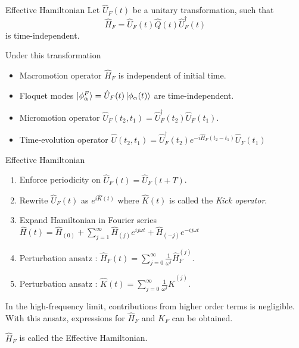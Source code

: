 \documentclass{beamer}
\begin{document}
\begin{frame}{Effective Hamiltonian}
 Let $\hat{U}_{F}(t)$ be a unitary transformation, such that
 \begin{equation}
  \hat{H}_{F} = \hat{U}_{F}(t)\hat{Q}(t)\hat{U}_{F}^{\dagger}(t)
 \end{equation} is time-independent.
 
 Under this transformation
 \begin{itemize}
  \item Macromotion operator $\hat{H}_{F}$ is independent of initial time.
  \item Floquet modes $\ket{\phi_\alpha^{F}} = \hat{U}_{F}(t)\ket{\phi_\alpha (t)}$ are time-independent.
  \item Micromotion operator $\hat{U}_{F}(t_2, t_1) = \hat{U}_{F}^{\dagger}(t_2)\hat{U}_{F}(t_1)$.
  \item Time-evolution operator $\hat{U}(t_2, t_1) = \hat{U}_{F}^{\dagger}(t_2)e^{-i\hat{H}_{F}(t_2 - t_1)}\hat{U}_{F}(t_1)$
 \end{itemize}
\end{frame}

\begin{frame}{Effective Hamiltonian}
\begin{enumerate}
 \item Enforce periodicity on $\hat{U}_{F}(t) = \hat{U}_{F}(t+T)$.
 \item Rewrite $\hat{U}_{F}(t)$ as $e^{i\hat{K}(t)}$ where $\hat{K}(t)$ is called the \emph{Kick operator}.
 \item Expand Hamiltonian in Fourier series $\hat{H}(t) = \hat{H}_{(0)} + \sum_{j=1}^{\infty}{\hat{H}_{(j)} e^{ij\omega t} + \hat{H}_{(-j)} e^{-ij\omega t}}$
 \item Perturbation ansatz :  $\hat{H}_{F}(t) = \sum_{j=0}^{\infty}{\frac{1}{\omega^j}\hat{H}_{F}^{(j)}}$.
 \item Perturbation ansatz : $\hat{K}(t) = \sum_{j=0}^{\infty}{\frac{1}{\omega^j}\hat{K}^{(j)}}$.
\end{enumerate}
In the high-frequency limit, contributions from higher order terms is negligible.
With this ansatz, expressions for $\hat{H}_{F}$ and $\hat{K}_{F}$ can be obtained.

$\hat{H}_{F}$ is called the \alert{Effective Hamiltonian}.
\end{frame}
\end{document}
